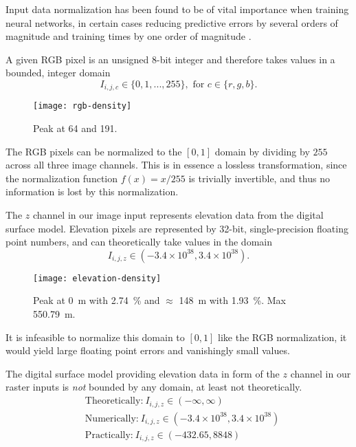 Input data normalization has been found to be of vital importance when training neural networks, in certain cases reducing predictive errors by several orders of magnitude and training times by one order of magnitude \cite{input_normalization_1997}.


A given RGB pixel is an unsigned 8-bit integer and therefore takes values in a bounded, integer domain
%
\begin{equation*}
  I_{i,j,c} \in \{0, 1, ..., 255\}, \text{ for } c \in \{r, g, b\}.
\end{equation*}

\begin{figure}[htb]
  \centering
  \texttt{[image: rgb-density]}
  \caption{
    Peak at 64 and 191.
  }
  \label{fig:rgb-density}
\end{figure}

The RGB pixels can be normalized to the $[0, 1]$ domain by dividing by $255$ across all three image channels.
This is in essence a lossless transformation, since the normalization function $f(x) = x/255$ is trivially invertible, and thus no information is lost by this normalization.

The $z$ channel in our image input represents elevation data from the digital surface model.
Elevation pixels are represented by 32-bit, single-precision floating point numbers, and can theoretically take values in the domain
%
\begin{equation*}
  I_{i,j,z} \in (-3.4 \times 10^{38}, 3.4 \times 10^{38}).
\end{equation*}

\begin{figure}[htb]
  \centering
  \texttt{[image: elevation-density]}
  \caption{
    Peak at \SI{0}{\meter} with \SI{2.74}{\percent} and $\approx$ \SI{148}{\meter} with \SI{1.93}{\percent}.
    Max \SI{550.79}{\meter}.
  }
  \label{fig:elevation-density}
\end{figure}

It is infeasible to normalize this domain to $[0, 1]$ like the RGB normalization, it would yield large floating point errors and vanishingly small values.

The digital surface model providing elevation data in form of the $z$ channel in our raster inputs is \textit{not} bounded by any domain, at least not theoretically.
~
\begin{align*}
  &\text{Theoretically:} ~ I_{i,j,z} \in (-\infty, \infty)
  \\
  &\text{Numerically:} ~ I_{i,j,z} \in (-3.4 \times 10^{38}, 3.4 \times 10^{38})
  \\
  &\text{Practically:} ~ I_{i,j,z} \in (-432.65, 8848)
\end{align*}
